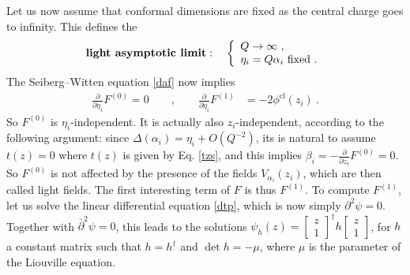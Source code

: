 \documentclass[12pt, a4paper, notitlepage, twoside]{report}
\numberwithin{equation}{section}
\theoremstyle{break}
\begin{document}
Let us now assume that conformal dimensions are fixed as the central charge goes to infinity.
This defines the 
\begin{align}
 \textbf{\boldmath light\ asymptotic\ limit}\index{light\ asymptotic\ limit}: \quad \left\{\begin{array}{l}  Q \to \infty \ ,\\ \eta_i=Q\alpha_i\ \text{fixed}\ .\end{array}\right.  
\end{align}
 The Seiberg--Witten equation \eqref{daf} now implies 
\begin{align}
 {\frac{\partial}{\partial \eta_i}} F^{(0)}  = 0 \qquad ,\qquad 
{\frac{\partial}{\partial \eta_i}} F^{(1)} & = -2\phi^\text{cl}(z_i) \ .
\label{pefo}
\end{align}
So $F^{(0)}$ is $\eta_i$-independent.
It is actually also $z_i$-independent, according to the following argument: since $\Delta(\alpha_i)=\eta_i + O(Q^{-2})$, its is natural to assume $t(z)=0$ where $t(z)$ is given by Eq. \eqref{tzs}, and this implies $\beta_i=-{\frac{\partial}{\partial z_i}} F^{(0)}=0$.
So $F^{(0)}$ is not affected by the presence of the fields $V_{\alpha_i}(z_i)$, which are then called light fields.
The first interesting term of $F$ is thus $F^{(1)}$.
To compute $F^{(1)}$, let us solve the linear differential equation \eqref{dtp}, which is now simply $\partial^2 \psi=0$.
Together with $\bar\partial^2\psi=0$, this leads to the solutions 
$\psi_h(z) = \left[\begin{smallmatrix} z \\ 1 \end{smallmatrix}\right]^\dagger h \left[\begin{smallmatrix} z \\ 1 \end{smallmatrix}\right]$, for $h$ a constant matrix such that $h=h^\dagger$ and $\det h = -\mu$, where $\mu$ is the parameter of the Liouville equation.
\end{document}
